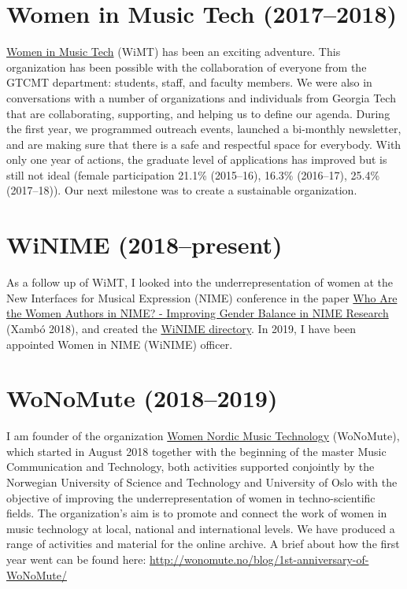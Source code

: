 \documentclass[10pt, a4paper]{article}
\begin{document}
\section*{Women in Music Tech (2017--2018)}

\href{http://www.gtcmt.gatech.edu/womeninmusictech}{Women in Music Tech} (WiMT) has been an exciting adventure. This organization has been possible with the collaboration of everyone from the GTCMT department: students, staff, and faculty members. We were also in conversations with a number of organizations and individuals from Georgia Tech that are collaborating, supporting, and helping us to define our agenda. During the first year, we programmed outreach events, launched a bi-monthly newsletter, and are making sure that there is a safe and respectful space for everybody. With only one year of actions, the graduate level of applications has improved but is still not ideal (female participation 21.1\% (2015--16), 16.3\% (2016--17), 25.4\% (2017--18)). Our next milestone was to create a sustainable organization. 

\section*{WiNIME (2018--present)}

As a follow up of WiMT, I looked into the underrepresentation of women at the New Interfaces for Musical Expression (NIME) conference in the paper \href{http://annaxambo.me/pub/Xambo_2018_WiNIME.pdf}{Who Are the Women Authors in NIME? - Improving Gender Balance in NIME Research} (Xambó 2018), and created the \href{https://axambo.github.io/directory-of-winime/}{WiNIME directory}. In 2019, I have been appointed Women in NIME (WiNIME) officer. 

\section*{WoNoMute (2018--2019)}

I am founder of the organization \href{http://wonomute.no}{Women Nordic Music Technology} (WoNoMute), which started in August 2018 together with the beginning of the master Music Communication and Technology, both activities supported conjointly by the Norwegian University of Science and Technology and University of Oslo with the objective of improving the underrepresentation of women in techno-scientific fields. The organization’s aim is to promote and connect the work of women in music technology at local, national and international levels. We have produced a range of activities and material for the online archive. A brief about how the first year went can be found here: \href{http://wonomute.no/blog/1st-anniversary-of-WoNoMute/}{http://wonomute.no/blog/1st-anniversary-of-WoNoMute/}
\end{document}
